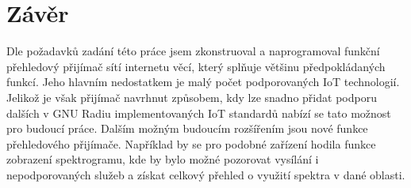 \documentclass{ctuthesis}
\begin{document}
\chapter{Závěr}
Dle požadavků zadání této práce jsem zkonstruoval a naprogramoval funkční přehledový přijímač sítí internetu věcí, který splňuje většinu předpokládaných funkcí. Jeho hlavním nedostatkem je malý počet podporovaných IoT technologií. Jelikož je však přijímač navrhnut způsobem, kdy lze snadno přidat podporu dalších v GNU Radiu implementovaných IoT standardů nabízí se tato možnost pro budoucí práce. Dalším možným budoucím rozšířením jsou nové funkce přehledového přijímače. Například by se pro podobné zařízení hodila funkce zobrazení spektrogramu, kde by bylo možné pozorovat vysílání i nepodporovaných služeb a získat celkový přehled o využití spektra v dané oblasti.

\printbibliography
\end{document}
